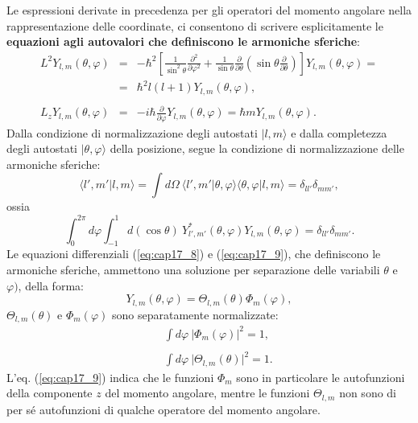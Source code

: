 \documentclass[a4paper,12pt,oneside]{book}
\begin{document}
Le espressioni derivate in precedenza per gli operatori del momento angolare nella rappresentazione delle coordinate, ci consentono di scrivere esplicitamente le \textbf{equazioni agli autovalori che definiscono le armoniche sferiche}:
\begin{eqnarray}
L^2 Y_{l,m} (\theta, \varphi) &=&-\hbar ^2 \left[\frac{1}{\sin ^2 \theta}\frac{\partial ^2}{\partial \varphi ^2}+\frac{1}{\sin \theta}\frac{\partial}{\partial \theta} \left(\sin \theta \frac{\partial}{\partial \theta}\right)\right]Y_{l,m}(\theta, \varphi) = \nonumber \\
&=& \hbar ^2 l(l+1)Y_{l,m}(\theta, \varphi) ,\label{eq:cap17_8}\\
& &\nonumber \\
L_zY_{l,m}(\theta, \varphi)&=& -i\hbar \frac{\partial}{\partial \varphi}Y_{l,m}(\theta, \varphi)= \hbar m Y_{l,m}(\theta, \varphi) \label{eq:cap17_9}.
\end{eqnarray}
Dalla condizione di normalizzazione degli autostati $\vert l,m \rangle$ e dalla completezza degli autostati $\vert \theta , \varphi\rangle $ della posizione, segue la condizione di normalizzazione delle armoniche sferiche:
\begin{equation}
\langle l' , m' \vert l,m \rangle = \int d\Omega \ \langle l' ,m'\vert \theta, \varphi \rangle \langle \theta , \varphi \vert l, m \rangle = \delta _{ll'} \delta _{mm'} ,
\end{equation}
ossia
\begin{equation}
\int _0 ^{2\pi} d\varphi \int _{-1} ^1 d(\cos \theta )\ Y_{l',m'}^* (\theta , \varphi ) Y_{l,m} (\theta, \varphi )=\delta _{ll'} \delta _{mm'}.
\end{equation}
Le equazioni differenziali (\ref{eq:cap17_8}) e (\ref{eq:cap17_9}), che definiscono le armoniche sferiche, ammettono una soluzione per separazione delle variabili $\theta$ e $\varphi)$, della forma:
\begin{equation}
Y_{l,m} (\theta , \varphi ) = \Theta _{l,m}(\theta)\Phi _m (\varphi) ,
\end{equation} $\Theta _{l,m}(\theta)$ e $\Phi _m (\varphi)$ sono separatamente normalizzate:
\begin{eqnarray}
& & \int d\varphi\ \vert \Phi _m (\varphi)\vert ^2 =1, \nonumber\\
\\
& & \int d\varphi\ \vert \Theta _{l,m}(\theta) \vert ^2 =1. \nonumber
\end{eqnarray}
L'eq. (\ref{eq:cap17_9}) indica che le funzioni $\Phi _m$ sono in particolare le autofunzioni della componente $z$ del momento angolare, mentre le funzioni $\Theta _{l,m}$ non sono di per sé autofunzioni di qualche operatore del momento angolare.\\
\end{document}
